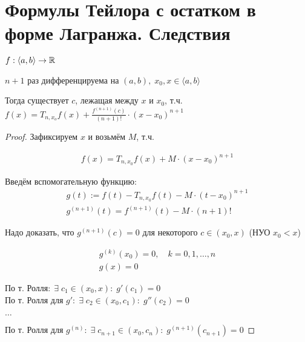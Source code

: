 
\section{Формулы Тейлора с остатком в форме Лагранжа. Следствия \href{https://youtu.be/au9-34CerJM?t=5698}{\Walley}}

\begin{theorem-non}
    $f: \langle a, b \rangle \rightarrow \mathbb{R}$

    $n + 1$ раз дифференцируема на $(a, b), \; x_0, x \in 
    \langle a, b \rangle$

    Тогда существует $c$, лежащая между $x$ и $x_0$, т.ч.
    $f(x) = T_{n,x_o} f(x) + \frac{f^{(n+1)}(c)}{(n+1)!} \cdot (x - x_0)^{n+1}$

    \begin{proof}
        Зафиксируем $x$ и возьмём $M$, т.ч.
        
        \begin{gather*}
            f(x) = T_{n,x_0} f(x) + M \cdot (x - x_0)^{n+1}
        \end{gather*}

        Введём вспомогательную функцию:
        \begin{gather*}
            g(t) := f(t) - T_{n, x_0}f(t) - M \cdot (t - x_0)^{n+1} \\
            g^{(n+1)}(t) = f^{(n+1)}(t) - M \cdot (n + 1)!
        \end{gather*}
        
        Надо доказать, что $g^{(n+1)}(c) = 0$ для некоторого $c \in (x_0, x)$ (НУО $x_0 < x$)

        \begin{gather*}
            g^{(k)}(x_0) = 0, \quad k = 0,1, \dots, n \\
            g(x) = 0
        \end{gather*}
        
        По т. Ролля$: \; \exists \; c_1 \in (x_0, x): \; g'(c_1) = 0$ \\
        По т. Ролля для $g': \; \exists \; c_2 \in (x_0, c_1): \; g''(c_2) = 0$

        $\dots$

        По т. Ролля для $g^{(n)}: \; \exists \; c_{n+1} \in (x_0, c_n): \; g^{(n+1)}(c_{n+1}) = 0$

    \end{proof}

\end{theorem-non}

